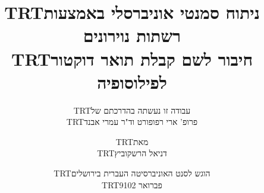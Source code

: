 \documentclass[12pt,a4paper]{report}
\newcommand{\heb}[1]{\bgroup\textdir TRT\hebfont #1\egroup}
\begin{document}
\pagebreak

\clearpage

\title{}
\author{
\heb{עבודה זו נעשתה בהדרכתם של} \\
\heb{פרופ' ארי רפופורט וד"ר עמרי אבנד}}
\date{}

\maketitle
\clearpage

\title{
\textbf{\heb{ניתוח סמנטי אוניברסלי באמצעות רשתות נוירונים}} \\
\vspace{2cm}
{\large\heb{חיבור לשם קבלת תואר דוקטור לפילוסופיה}}
}
\author{
\heb{מאת}\\
\heb{דניאל הרשקוביץ}
\vspace{2cm}
}
\date{
\heb{הוגש לסנט האוניברסיטה העברית בירושלים} \\
\heb{פברואר 9102}
}

\maketitle
\maketitle
\end{document}
